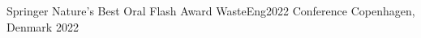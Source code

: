 



\begin{cvhonors}

  \cvhonor
  {Springer Nature's Best Oral Flash Award} %
  {WasteEng2022 Conference} %
  {Copenhagen, Denmark} %
  {2022} %

\end{cvhonors}


